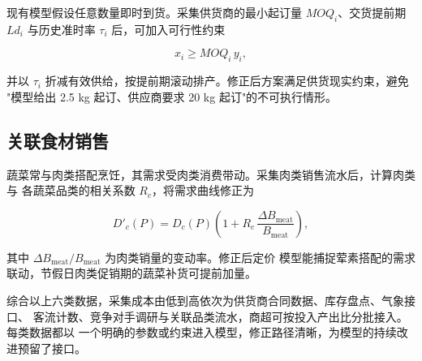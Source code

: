 现有模型假设任意数量即时到货。采集供货商的最小起订量 $MOQ_i$、交货提前期
$Ld_i$ 与历史准时率 $\tau_i$ 后，可加入可行性约束

\begin{equation}
x_i\ge MOQ_i\,y_i,
\label{eq:q4_moq}
\end{equation}

并以 $\tau_i$ 折减有效供给，按提前期滚动排产。修正后方案满足供货现实约束，避免
"模型给出 2.5 kg 起订、供应商要求 20 kg 起订"的不可执行情形。

\subsection{关联食材销售}

蔬菜常与肉类搭配烹饪，其需求受肉类消费带动。采集肉类销售流水后，计算肉类与
各蔬菜品类的相关系数 $R_c$，将需求曲线修正为

\begin{equation}
D'_c(P)=D_c(P)\left(1+R_c\,\frac{\Delta B_{\mathrm{meat}}}{B_{\mathrm{meat}}}\right),
\label{eq:q4_meat}
\end{equation}

其中 $\Delta B_{\mathrm{meat}}/B_{\mathrm{meat}}$ 为肉类销量的变动率。修正后定价
模型能捕捉荤素搭配的需求联动，节假日肉类促销期的蔬菜补货可提前加量。

综合以上六类数据，采集成本由低到高依次为供货商合同数据、库存盘点、气象接口、
客流计数、竞争对手调研与关联品类流水，商超可按投入产出比分批接入。每类数据都以
一个明确的参数或约束进入模型，修正路径清晰，为模型的持续改进预留了接口。
